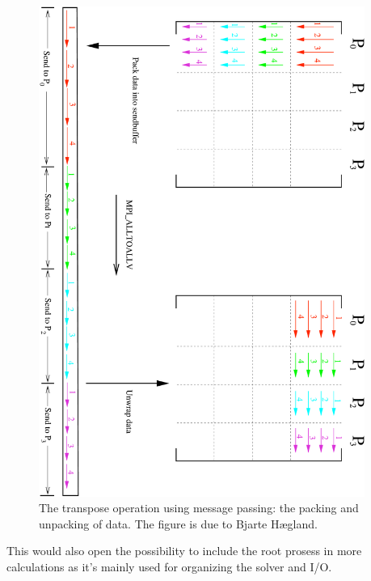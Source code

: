 \begin{figure}[htbp]
	\centering
	\includegraphics[width=0.95\textwidth, angle=90]{illustrations/matrix_blocktranspose.pdf}
	\caption{The transpose operation using message passing: the packing and unpacking
of data. The figure is due to Bjarte Hægland.}
	\label{fig:label}
\end{figure}

This would also open the possibility to include the root prosess in more calculations as it's mainly used for organizing the solver and I/O.





